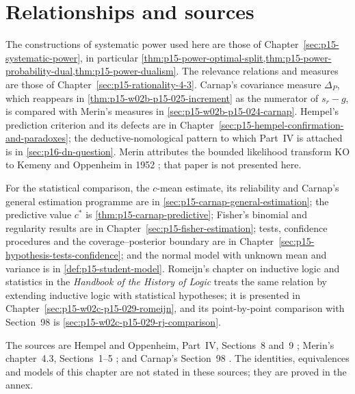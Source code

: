 \section{Relationships and sources}
\label{sec:p15-w02b-p15-025-relations}

The constructions of systematic power used here are those of
Chapter~\ref{sec:p15-systematic-power}, in particular
\cref{thm:p15-power-optimal-split,thm:p15-power-probability-dual,thm:p15-power-dualism}.
The relevance relations and measures are those of
Chapter~\ref{sec:p15-rationality-4-3}. Carnap's covariance measure
\(\Delta_P\), which reappears in
\cref{thm:p15-w02b-p15-025-increment} as the numerator of
\(s_r-g\), is compared with Merin's measures in
\cref{sec:p15-w02b-p15-024-carnap}. Hempel's prediction criterion and its
defects are in Chapter~\ref{sec:p15-hempel-confirmation-and-paradoxes};
the deductive-nomological pattern to which Part~IV is attached is in
\cref{sec:p16-dn-question}. Merin attributes the bounded likelihood
transform KO to Kemeny and Oppenheim in 1952
\cite[p.~270]{Merin2021Relevance}; that paper is not presented here.

For the statistical comparison, the \(c\)-mean estimate, its
reliability and Carnap's general estimation programme are in
\cref{sec:p15-carnap-general-estimation}; the predictive value \(c^*\)
is \cref{thm:p15-carnap-predictive}; Fisher's binomial and regularity
results are in Chapter~\ref{sec:p15-fisher-estimation}; tests,
confidence procedures and the coverage--posterior boundary are in
Chapter~\ref{sec:p15-hypothesis-tests-confidence}; and the normal model
with unknown mean and variance is in \cref{def:p15-student-model}.
Romeijn's chapter on inductive logic and statistics in the
\emph{Handbook of the History of Logic} treats the same relation by
extending inductive logic with statistical hypotheses; it is presented
in Chapter~\ref{sec:p15-w02c-p15-029-romeijn}, and its point-by-point
comparison with Section~98 is \cref{sec:p15-w02c-p15-029-rj-comparison}.

The sources are Hempel and Oppenheim, Part~IV, Sections~8 and~9
\cite[pp.~164--173]{HempelOppenheim1948Explanation}; Merin's
chapter~4.3, Sections~1--5
\cite[pp.~265--273]{Merin2021Relevance}; and Carnap's Section~98
\cite[sec.~98, pp.~511--520]{Carnap1950Probability}. The identities,
equivalences and models of this chapter are not stated in these
sources; they are proved in the annex.

